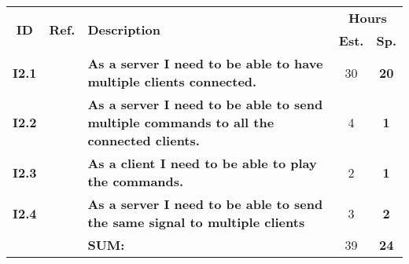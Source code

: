   \label{tab:sprint2stories}
 \def\arraystretch{1.25}
 
\begin{longtable}{ccXcc}
\toprule[0.5mm]
\multirow{2}{*}{\textbf{ID}} &
\multirow{2}{*}{\textbf{Ref.}} & \multirow{2}{*}{\textbf{Description}} & \multicolumn{2}{c}{\textbf{Hours}} \\
 				& & & \textbf{Est.} & \textbf{Sp.} \\ 				
\midrule

\textbf{I2.1} 	& {?} & {\bf As a server I need to be able to have multiple clients connected.} 							& 	30	& \textbf{20} \\
	
\textbf{I2.2} 	& {?} & {\bf As a server I need to be able to send multiple commands to all the connected clients.} 		& 	4	& \textbf{1} \\

\textbf{I2.3} 	& {?} & {\bf  As a client I need to be able to play the commands.}										& 	2	& \textbf{1} \\
\textbf{I2.4} 	& {?} & {\bf  As a server I need to be able to send the same signal to multiple clients} 				& 	3	& \textbf{2} \\		
				
\hline
				&& \textbf{SUM:}		&		39	& \textbf{24}\\																			
\bottomrule[0.5mm]
\end{longtable}